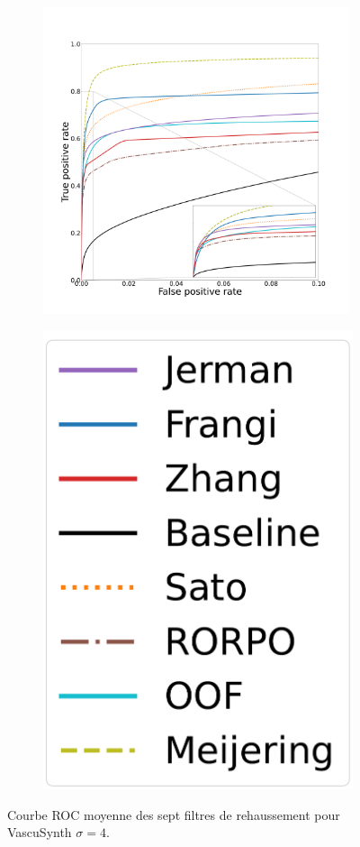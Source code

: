 \begin{figure}[!ht]
  \begin{subfigure}[t]{0.78\textwidth}
    \centering
  \includegraphics[clip = true, trim  =  125 125 100 200, height=9cm]{Images/Vascu_4_ROC.pdf}
\end{subfigure}
\begin{subfigure}[t]{0.2\textwidth}
  \includegraphics[width=\textwidth,clip = true]{Images/standAloneLegend.pdf}
\end{subfigure}
\caption{Courbe ROC moyenne des sept filtres de rehaussement pour VascuSynth $\sigma=4$.}
\end{figure}

